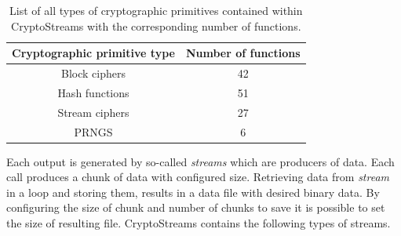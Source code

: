 \documentclass[
    digital,    %
    oneside,    %
    color,
    11pt,
    nocover,
    notable,
    nolof,
    nolot,
    final
]{fithesis3}
\renewcommand\_{\textunderscore\allowbreak}
\begin{document}
\begin{table}[t]
	\centering	
	\begin{tabular}{|c|c|}
		\hline
		\textbf{\large Cryptographic primitive type} &  \textbf{\large Number of functions} \\ \hline
		Block ciphers  & 42 \\ \hline
		Hash functions & 51 \\ \hline  
		Stream ciphers & 27 \\ \hline
		PRNGS 		   & 6  \\ \hline		
	\end{tabular}
	\caption{List of all types of cryptographic primitives contained within CryptoStreams with the corresponding number of functions.}
	\label{table:all-cryptoprimitives}
\end{table}

Each output is generated by so-called \textit{streams} which are producers of data. Each call produces a chunk of data with configured size. Retrieving data from \textit{stream} in a loop and storing them, results in a data file with desired binary data. By configuring the size of chunk and number of chunks to save it is possible to set the size of resulting file. CryptoStreams contains the following types of streams.
\end{document}
